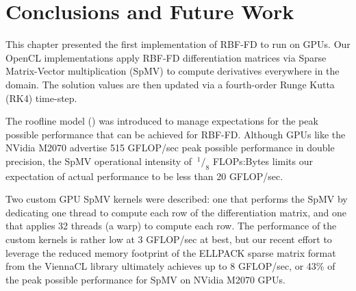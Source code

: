\documentclass{report}
\begin{document}
\section{Conclusions and Future Work}

This chapter presented the first implementation of RBF-FD to run on GPUs. Our OpenCL implementations apply RBF-FD differentiation matrices via Sparse Matrix-Vector multiplication (SpMV) to compute derivatives everywhere in the domain. The solution values are then updated via a fourth-order Runge Kutta (RK4) time-step. 


The roofline model (\cite{Williams2009}) was introduced to manage expectations for the peak possible performance that can be achieved for RBF-FD. Although GPUs like the NVidia M2070 advertise 515 GFLOP/sec peak possible performance in double precision, the SpMV operational intensity of $\ ^{1}/_{8}$ FLOPs:Bytes limits our expectation of actual performance to be less than 20 GFLOP/sec.   

Two custom GPU SpMV kernels were described: one that performs the SpMV by dedicating one thread to compute each row of the differentiation matrix, and one that applies 32 threads (a warp) to compute each row. The performance of the custom kernels is rather low at 3 GFLOP/sec at best, but our recent effort to leverage the reduced memory footprint of the ELLPACK sparse matrix format from the ViennaCL library ultimately achieves up to 8 GFLOP/sec, or 43\% of the peak possible performance for SpMV on NVidia M2070 GPUs. 
\end{document}
